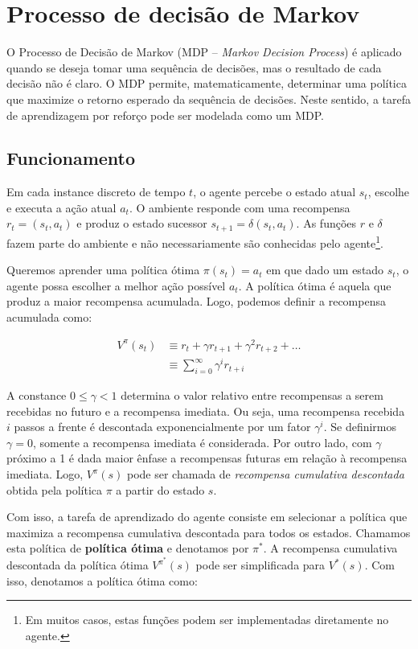 \section{Processo de decisão de Markov}

O Processo de Decisão de Markov (MDP -- \textit{Markov Decision Process}) é aplicado quando se deseja tomar uma sequência de decisões, mas o resultado de cada decisão não é claro. O MDP permite, matematicamente, determinar uma política que maximize o retorno esperado da sequência de decisões. Neste sentido, a tarefa de aprendizagem por reforço pode ser modelada como um MDP.

\subsection{Funcionamento}

Em cada instance discreto de tempo $t$, o agente percebe o estado atual $s_t$, escolhe e executa a ação atual $a_t$. O ambiente responde com uma recompensa $r_t = (s_t, a_t)$ e produz o estado sucessor $s_{t+1} = \delta(s_t, a_t)$. As funções $r$ e $\delta$ fazem parte do ambiente e não necessariamente são conhecidas pelo agente\footnote{Em muitos casos, estas funções podem ser implementadas diretamente no agente.}.

Queremos aprender uma política ótima $\pi(s_t) = a_t$ em que dado um estado $s_t$, o agente possa escolher a melhor ação possível $a_t$. A política ótima é aquela que produz a maior recompensa acumulada. Logo, podemos definir a recompensa acumulada como:

\begin{align*}
V^\pi(s_t) &\equiv r_t + \gamma r_{t+1} + \gamma^2 r_{t+2} + \hdots \\[10pt]
&\equiv \sum_{i=0}^{\infty} \gamma^i r_{t+i}
\end{align*}

A constance $0 \le \gamma < 1$ determina o valor relativo entre recompensas a serem recebidas no futuro e a recompensa imediata. Ou seja, uma recompensa recebida $i$ passos a frente é descontada exponencialmente por um fator $\gamma^i$. Se definirmos $\gamma = 0$, somente a recompensa imediata é considerada. Por outro lado, com $\gamma$ próximo a 1 é dada maior ênfase a recompensas futuras em relação à recompensa imediata. Logo, $V^\pi(s)$ pode ser chamada de \textit{recompensa cumulativa descontada} obtida pela política $\pi$ a partir do estado $s$.

Com isso, a tarefa de aprendizado do agente consiste em selecionar a política que maximiza a recompensa cumulativa descontada para todos os estados. Chamamos esta política de \textbf{política ótima} e denotamos por $\pi^*$. A recompensa cumulativa descontada da política ótima $V^{\pi^*}(s)$ pode ser simplificada para $V^*(s)$. Com isso, denotamos a política ótima como:

